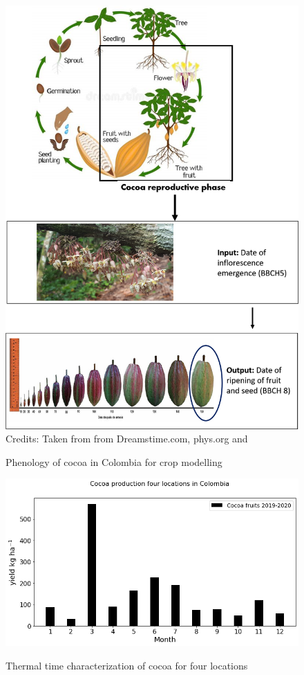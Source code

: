 \documentclass[gene,journal,article,submit,moreauthors,pdftex]{Definitions/mdpi}
\begin{document}
 
\begin{figure}[h!]
	\centering
	\caption{\footnotesize {Phenology of cocoa in Colombia for crop modelling\\}} 
	\includegraphics[scale=0.3]{images/phenology.png}\\
	\footnotesize{Credits: Taken from from Dreamstime.com, phys.org \citep{toledo2021} and \cite{lopez2018}}
	\label{fig:pheno}
\end{figure}


\begin{figure}[h]
	\centering
	\caption{\footnotesize {Thermal time characterization of cocoa for four locations\\}}
	\includegraphics[scale=0.35]{images/yieldmonth.png}
	\label{fig:yield}
\end{figure}
\newpage
\end{document}
